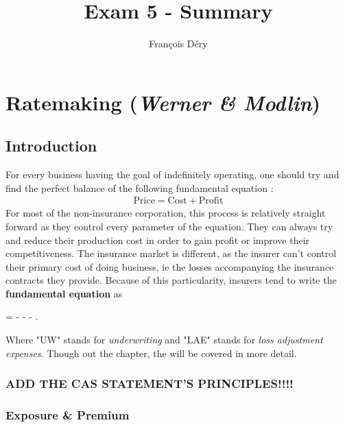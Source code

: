 \documentclass[11pt, english]{memoir}
\numberwithin{definition}{section}
\begin{document}
	
	\title{\normalfont\textbf{Exam 5 - Summary}}
	\author{François Déry}
	\date{}
	\maketitle
	
	{\color{black}\tableofcontents}
	
	
	\part{Ratemaking (\emph{Werner \& Modlin})}
	\chapter{Introduction}
	For every business having the goal of indefinitely operating, one should try and find the perfect balance of the following fundamental equation : 
	\begin{align*}
	\text{Price} = \text{Cost} + \text{Profit}
	\end{align*}
	For most of the non-insurance corporation, this process is relatively straight forward as they control every parameter of the equation. They can always try and reduce their production cost in order to gain profit or improve their competitiveness. The insurance market is different, as the insurer can't control their primary cost of doing business, ie the losses accompanying the insurance contracts they provide. Because of this particularity, insurers tend to write the \textbf{fundamental equation} as 
	\begin{tcolorbox}
		 =  -  -  - .
	\end{tcolorbox}
	Where "UW" stands for \emph{underwriting} and "LAE" stands for \emph{loss adjustment expenses}. Though out the chapter, the will be covered in more detail. 
	
	
	\section{ADD THE CAS STATEMENT'S PRINCIPLES!!!!}
	
	
	\section{Exposure \& Premium}
	
\end{document}

